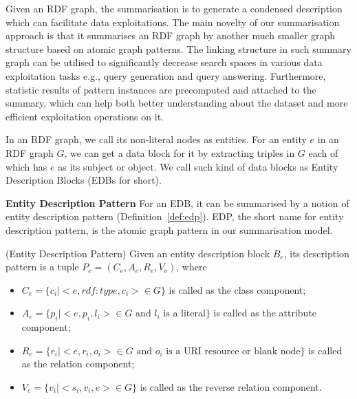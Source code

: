 \vspace{-2mm}
Given an RDF graph, the summarisation is to generate a condensed description which can facilitate data exploitations. The main novelty of our summarisation approach is that it summarises an RDF graph by another much smaller graph structure based on atomic graph patterns. The linking structure in such summary graph can be utilised to significantly decrease search spaces in various data exploitation tasks e.g., query generation and query answering. Furthermore, statistic results of pattern instances are precomputed and attached to the summary, which can help both better understanding about the dataset and more efficient exploitation operations on it. 

In an RDF graph, we call its non-literal nodes as entities. For an entity $e$ in an RDF graph $G$, we can get a data block for it by extracting triples in $G$ each of which has $e$ as its subject or object. We call such kind of data blocks as Entity Description Blocks (EDBs for short). 

\noindent \textbf{Entity Description Pattern} For an EDB, it can be summarised by a notion of entity description pattern (Definition~\ref{def:edp}). EDP, the short name for entity description pattern, is the atomic graph pattern in our summarisation model. 

\begin{definition}
\label{def:edp} 
(Entity Description Pattern) Given an entity description block $B_e$, its description pattern is a tuple $P_e=(C_e,A_e,R_e,V_e)$, where
\begin{itemize}
\item $C_e=\{c_i |<e, rdf:type,c_i> \in G\}$   is called as the class component; 
\item $A_e=\{p_i |<e,p_i,l_i> \in G \text{ and $l_i$  is a literal}\}$  is called as the attribute component;
\item $R_e=\{r_i |<e,r_i,o_i> \in G \text{ and $o_i$  is a URI resource or blank node}\}$  is called as the relation component;
\item $V_e=\{v_i |<s_i,v_i,e> \in G\}$ is called as the reverse relation component.
\end{itemize}
\end{definition}

